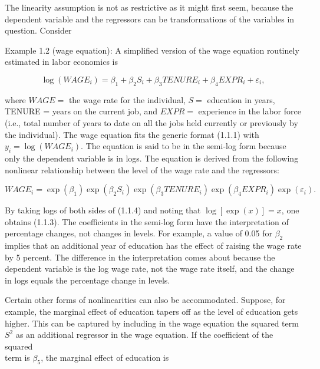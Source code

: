 \documentclass[10pt]{article}
\begin{document}
The linearity assumption is not as restrictive as it might first seem, because the dependent variable and the regressors can be transformations of the variables in question. Consider

Example 1.2 (wage equation): A simplified version of the wage equation routinely estimated in labor economics is


\begin{equation*}
\log \left(W A G E_{i}\right)=\beta_{1}+\beta_{2} S_{i}+\beta_{3} T E N U R E_{i}+\beta_{4} E X P R_{i}+\varepsilon_{i}, \tag{1.1.3}
\end{equation*}


where $W A G E=$ the wage rate for the individual, $S=$ education in years, TENURE = years on the current job, and $E X P R=$ experience in the labor force (i.e., total number of years to date on all the jobs held currently or previously by the individual). The wage equation fits the generic format (1.1.1) with $y_{i}=\log \left(W A G E_{i}\right)$. The equation is said to be in the semi-log form because only the dependent variable is in logs. The equation is derived from the following nonlinear relationship between the level of the wage rate and the regressors:


\begin{equation*}
W A G E_{i}=\exp \left(\beta_{1}\right) \exp \left(\beta_{2} S_{i}\right) \exp \left(\beta_{3} T E N U R E_{i}\right) \exp \left(\beta_{4} E X P R_{i}\right) \exp \left(\varepsilon_{i}\right) . \tag{1.1.4}
\end{equation*}


By taking logs of both sides of (1.1.4) and noting that $\log [\exp (x)]=x$, one obtains (1.1.3). The coefficients in the semi-log form have the interpretation of percentage changes, not changes in levels. For example, a value of 0.05 for $\beta_{2}$ implies that an additional year of education has the effect of raising the wage rate by 5 percent. The difference in the interpretation comes about because the dependent variable is the log wage rate, not the wage rate itself, and the change in logs equals the percentage change in levels.

Certain other forms of nonlinearities can also be accommodated. Suppose, for example, the marginal effect of education tapers off as the level of education gets higher. This can be captured by including in the wage equation the squared term $S^{2}$ as an additional regressor in the wage equation. If the coefficient of the squared\\
term is $\beta_{5}$, the marginal effect of education is
\end{document}
